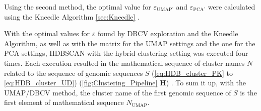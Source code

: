 
Using the second method, the optimal value for $\varepsilon_{\text{UMAP'}}$ and $\varepsilon_{\text{PCA'}}$ were calculated using the Kneedle Algorithm \autoref{sec:Kneedle} \autocite{halko_finding_2010}.

With the optimal values for $\varepsilon$ found by \gls{DBCV} exploration and the Kneedle Algorithm, as well as with the matrix for the \gls{UMAP} settings and the one for the \gls{PCA} settings, \gls{HDBSCAN} with the hybrid clustering setting was executed four times. Each execution resulted in the mathematical sequence of cluster names $N$ related to the sequence of genomic sequences $S$ (\autoref{eq:HDB_cluster_PK} to \autoref{eq:HDB_cluster_UD}) (\autoref{fig:Clustering_Pipeline} \textsf{\textbf{H}}) \autocite{mcinnes_hdbscan_2017, malzer_hybrid_2020}. To sum it up, with the \acrshort{UMAP}/\acrshort{DBCV} method, the cluster name of the first genomic sequence of $S$ is the first element of mathematical sequence $N_{\text{UMAP}}$. 



